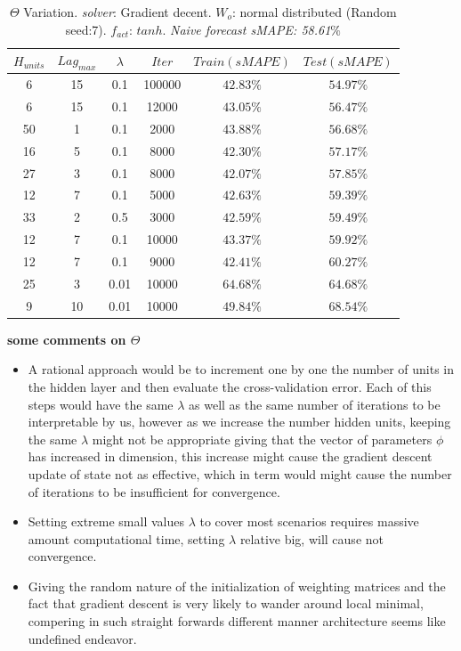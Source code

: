 \begin{table}[h!]
	\begin{center}
		\begin{tabular}{||c c c c c c||} 
			\hline
			$H_{units}$ &$Lag_{max}$ &$\lambda$ & $Iter$ & $Train(sMAPE)$ & $Test(sMAPE)$ \\ [0.5ex] 
			\hline\hline
			6& 15 & 0.1 & 100000 & $42.83\%$ & $54.97\%$ \\ 
			\hline
			6& 15 & 0.1 & 12000 & $43.05\%$ & $56.47\%$ \\ 
			\hline
			50& 1 & 0.1 & 2000 & $43.88\%$ & $56.68\%$ \\ 
			\hline
			16& 5 & 0.1 & 8000 & $42.30\%$ & $57.17\%$ \\ 
			\hline
			27& 3 & 0.1 & 8000 & $42.07\%$ & $57.85\%$ \\ 
			\hline
			12& 7 & 0.1 & 5000 & $42.63\%$ & $59.39\%$ \\ 
			\hline
			33& 2 & 0.5 & 3000 & $42.59\%$ & $59.49\%$ \\
			\hline
			12& 7 & 0.1 & 10000 & $43.37\%$ &$59.92\%$ \\ 
			\hline
			12& 7 & 0.1 & 9000 & $42.41\%$ & $60.27\%$ \\ 
			\hline
			25& 3 & 0.01 & 10000 & $64.68\%$ & $64.68\%$ \\ 
			\hline
			9& 10 & 0.01 & 10000 & $49.84\%$ & $68.54\%$ \\ 
			\hline
		\end{tabular}
		\caption{ $\Theta$ Variation. \textit{solver}: Gradient decent. $W_{o}$: normal distributed (Random seed:7). $f_{act}$: $tanh$. \textit{Naive forecast sMAPE: 58.61$\%$}}
		\label{table:mlp_at}
	\end{center}
\end{table}

\textbf{some comments on $\Theta$}
\begin{itemize}
	\item A rational approach would be to increment one by one the number of units in the hidden layer and then evaluate the cross-validation error. Each of this steps would have the same $\lambda$ as well as the same number of iterations to be interpretable by us, however as we increase the number hidden units, keeping the same $\lambda$ might not be appropriate giving that the vector of parameters $\phi$ has increased in dimension, this increase might cause the gradient descent update of state not as effective, which in term would might cause the number of iterations to be insufficient for convergence.
	\item Setting extreme small values $\lambda$ to cover most scenarios requires massive amount computational time, setting $\lambda$ relative big, will cause not convergence.
	\item Giving the random nature of the initialization of weighting matrices and the fact that gradient descent is very likely to wander around local minimal, compering in such straight forwards different manner architecture seems like undefined endeavor.
\end{itemize}




